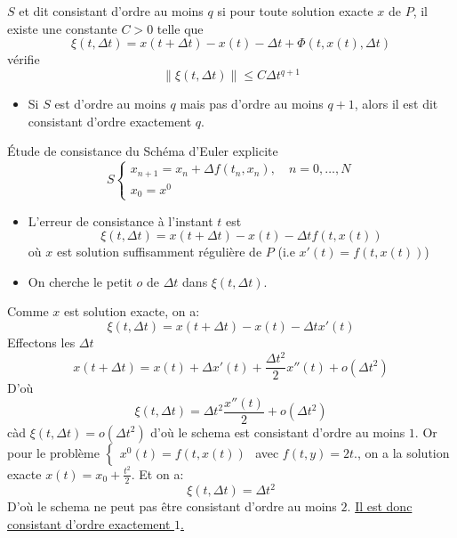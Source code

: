 \begin{definition}
    $S$ et dit consistant d'ordre au moins  $q$ si pour toute solution exacte  $x$ de  $P$, il existe une constante  $C > 0$ telle que  
    \[
        \xi(t, \Delta t) = x(t + \Delta t) - x(t) - \Delta t + \Phi(t, x(t), \Delta t)
    \] 
    vérifie
    \[
        \|\xi(t, \Delta t)\| \le C \Delta t^{q+1}
    \] 
    \begin{itemize}
        \item Si $S$ est d'ordre au moins  $q$ mais pas d'ordre au moins  $q+1$, alors il est dit consistant d'ordre exactement  $q$.
    \end{itemize}
\end{definition}
\begin{eg}
   Étude de consistance du Schéma d'Euler explicite
   \[
   S \begin{cases}
       x_{n+1} = x_n + \Delta f(t_n, x_n), \quad n = 0, \ldots, N\\
       x_0 = x^0
   \end{cases}
   \] 
   \begin{itemize}
       \item 
   L'erreur de consistance à l'instant $t$ est 
    \[
        \xi(t, \Delta t) = x(t + \Delta t) - x(t) - \Delta t f(t, x(t)) 
   \] 
   où $x$ est solution suffisamment régulière de  $P$ (i.e $x'(t) = f(t, x(t))$)
\item On cherche le petit $o$ de  $\Delta t$ dans  $\xi(t, \Delta t)$.
\end{itemize}
Comme $x$ est solution exacte, on a:
 \[
\xi(t, \Delta t) = x(t + \Delta t) - x(t) - \Delta t x'(t)
\] 
Effectons les $\Delta t$
 \[
x(t + \Delta t) = x(t) + \Delta x'(t) + \frac{\Delta t^2}{2}x''(t) + o(\Delta t^2)
\] 
D'où
\[
\xi(t, \Delta t) = \Delta t^2 \frac{x''(t)}{2} + o(\Delta t^2)
\] 
càd $\xi(t, \Delta t) = o(\Delta t^2)$ d'où le schema est consistant d'ordre au moins  $1$. 
Or pour le problème $\begin{cases}
    x^0(t) = f(t, x(t))
\end{cases}$ avec $f(t, y) = 2t$., on a la solution exacte  $x(t) = x_0 + \frac{t^2}{2}$. Et on a:
\[
\xi(t, \Delta t) = \Delta t^2
\] 
D'où le schema ne peut pas être consistant d'ordre au moins $2$. \underline{Il est donc consistant d'ordre exactement $1$.}
\end{eg}
